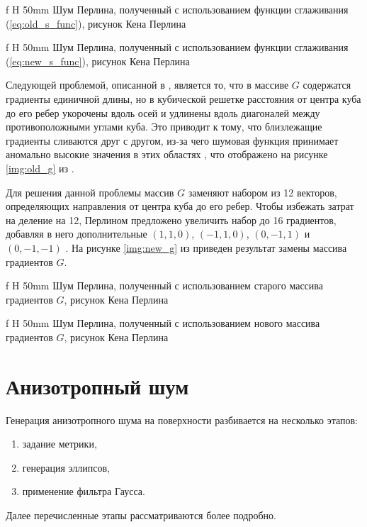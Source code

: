  {f} {H} {50mm}%
{Шум Перлина, полученный с использованием функции сглаживания (\ref{eq:old_s_func}), рисунок Кена Перлина \cite{impperlin}}

 {f} {H} {50mm}%
{Шум Перлина, полученный с использованием функции сглаживания (\ref{eq:new_s_func}), рисунок Кена Перлина \cite{impperlin}}

Следующей проблемой, описанной в \cite{impperlin}, является то, что в массиве $G$ содержатся градиенты единичной длины, но в кубической решетке расстояния от центра куба до его ребер укорочены вдоль осей и удлинены вдоль диагоналей между противоположными углами куба. 
Это приводит к тому, что близлежащие градиенты сливаются друг с другом, из-за чего шумовая функция принимает аномально высокие значения в этих областях \cite{impperlin}, что отображено на рисунке \ref{img:old_g} из \cite{impperlin}. 

Для решения данной проблемы массив $G$ заменяют набором из 12 векторов, определяющих направления от центра куба до его ребер. 
Чтобы избежать затрат на деление на 12, Перлином предложено увеличить набор до 16 градиентов, добавляя в него дополнительные $(1,1,0)$, $(-1,1,0)$, $(0,-1,1)$ и $(0,-1,-1)$ \cite{impperlin}. 
На рисунке \ref{img:new_g} из \cite{impperlin} приведен результат замены массива градиентов $G$.

 {f} {H} {50mm}%
{Шум Перлина, полученный с использованием старого массива градиентов $G$, рисунок Кена Перлина \cite{impperlin}}

 {f} {H} {50mm}%
{Шум Перлина, полученный с использованием нового массива градиентов $G$, рисунок Кена Перлина \cite{impperlin}}

\section{Анизотропный шум}

Генерация анизотропного шума \cite{feng2008anisotropic} на поверхности разбивается на несколько этапов:
\begin{enumerate}
	\item задание метрики,
	\item генерация эллипсов,
	\item применение фильтра Гаусса.
\end{enumerate}

Далее перечисленные этапы рассматриваются более подробно.

